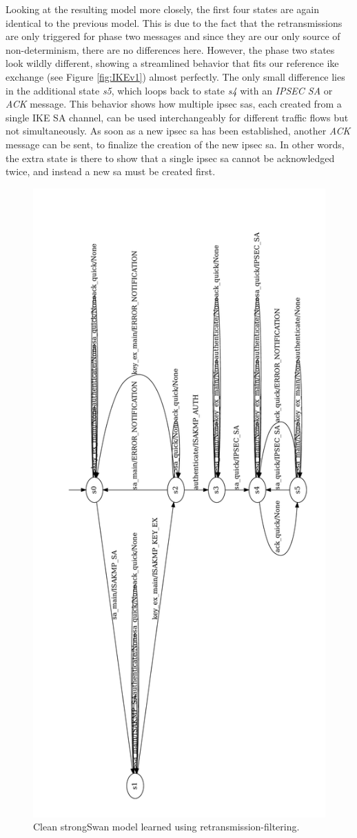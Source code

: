 Looking at the resulting model more closely, the first four states are again identical to the previous model. This is due to the fact that the retransmissions are only triggered for phase two messages and since they are our only source of non-determinism, there are no differences here. However, the phase two states look wildly different, showing a streamlined behavior that fits our reference \ac{ike} exchange (see Figure \ref{fig:IKEv1}) almost perfectly. The only small difference lies in the additional state \emph{s5}, which loops back to state \emph{s4} with an \emph{IPSEC SA} or \emph{ACK} message. This behavior shows how multiple \ac{ipsec} \acp{sa}, each created from a single IKE SA channel, can be used interchangeably for different traffic flows but not simultaneously. As soon as a new \ac{ipsec} \ac{sa} has been established, another \emph{ACK} message can be sent, to finalize the creation of the new \ac{ipsec} \ac{sa}. In other words, the extra state is there to show that a single \ac{ipsec} \ac{sa} cannot be acknowledged twice, and instead a new \ac{sa} must be created first. 

\begin{figure}[H]
	\includegraphics[width=0.7\linewidth]{images/models/Reference_rotated}
	\caption{Clean strongSwan model learned using retransmission-filtering.}
	\label{fig:reference}
\end{figure}

